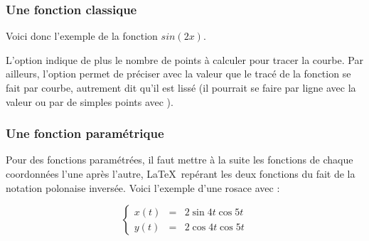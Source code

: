 \subsubsection{Une fonction classique}

Voici donc l'exemple de la fonction $sin (2x)$.


L'option  indique de plus le nombre de points à calculer pour tracer la courbe. Par ailleurs, l'option  permet de préciser avec la valeur  que le tracé de la fonction se fait par courbe, autrement dit qu'il est lissé (il pourrait se faire par ligne avec la valeur  ou par de simples points avec ). 

\subsubsection{Une fonction paramétrique}

Pour des fonctions paramétrées, il faut mettre à la suite les fonctions de chaque coordonnées l'une après l'autre, \LaTeX\ repérant les deux fonctions du fait de la notation polonaise inversée. Voici l'exemple d'une rosace avec  :

$$
\left\{
\begin{array}{lcr}
x(t)&=& 2 \sin 4t \cos 5t \\
y(t)&=& 2 \cos 4t \cos 5t 
\end{array}
\right.
$$

